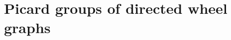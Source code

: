 \documentclass[11pt,reqno]{amsart}
\theoremstyle{definition}
\theoremstyle{plain}
\begin{document}


\section{Picard groups of directed wheel graphs} \label{section: wheel graphs}


\end{document}

